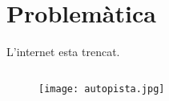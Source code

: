 \section{Problemàtica}
\begin{frame}[Problemàtica]

  L'internet esta trencat.
  \begin{columns}
    \begin{column}{0.5\textwidth}
      \begin{figure}[htbp!]
        \texttt{[image: autopista.jpg]}
      \end{figure}
    \end{column}

  \end{columns}

\end{frame}
